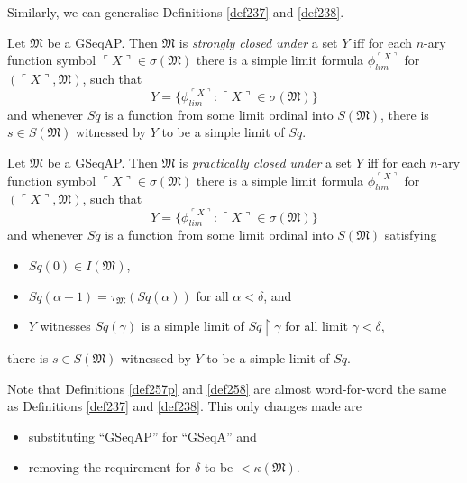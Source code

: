 \documentclass[12pt]{article}
\numberwithin{equation}{section}
\begin{document}
Similarly, we can generalise Definitions \ref{def237} and \ref{def238}.

\begin{defi}\label{def257p}
Let $\mathfrak{M}$ be a GSeqAP. Then $\mathfrak{M}$ is \emph{strongly closed under} a set $Y$ iff for each $n$-ary function symbol $\ulcorner X \urcorner \in \sigma(\mathfrak{M})$ there is a simple limit formula $\phi_{lim}^{\ulcorner X \urcorner}$ for $(\ulcorner X \urcorner, \mathfrak{M})$, such that 
\begin{equation*}
    Y = \{\phi_{lim}^{\ulcorner X \urcorner} : \ulcorner X \urcorner \in \sigma(\mathfrak{M})\}
\end{equation*}
and whenever $Sq$ is a function from some limit ordinal into $S(\mathfrak{M})$, there is $s \in S(\mathfrak{M})$ witnessed by $Y$ to be a simple limit of $Sq$.
\end{defi}

\begin{defi}\label{def258}
Let $\mathfrak{M}$ be a GSeqAP. Then $\mathfrak{M}$ is \emph{practically closed under} a set $Y$ iff for each $n$-ary function symbol $\ulcorner X \urcorner \in \sigma(\mathfrak{M})$ there is a simple limit formula $\phi_{lim}^{\ulcorner X \urcorner}$ for $(\ulcorner X \urcorner, \mathfrak{M})$, such that 
\begin{equation*}
    Y = \{\phi_{lim}^{\ulcorner X \urcorner} : \ulcorner X \urcorner \in \sigma(\mathfrak{M})\}
\end{equation*}
and whenever $Sq$ is a function from some limit ordinal into $S(\mathfrak{M})$ satisfying
\begin{itemize}
    \item $Sq(0) \in I(\mathfrak{M})$,
    \item $Sq(\alpha + 1) = \tau_{\mathfrak{M}}(Sq(\alpha))$ for all $\alpha < \delta$, and
    \item $Y$ witnesses $Sq(\gamma)$ is a simple limit of $Sq \restriction \gamma$ for all limit $\gamma < \delta$,
\end{itemize}
there is $s \in S(\mathfrak{M})$ witnessed by $Y$ to be a simple limit of $Sq$.
\end{defi}

Note that Definitions \ref{def257p} and \ref{def258} are almost word-for-word the same as Definitions \ref{def237} and \ref{def238}. This only changes made are \begin{itemize}
    \item substituting ``GSeqAP'' for ``GSeqA'' and 
    \item removing the requirement for $\delta$ to be $< \kappa(\mathfrak{M})$.
\end{itemize} 
\end{document}
